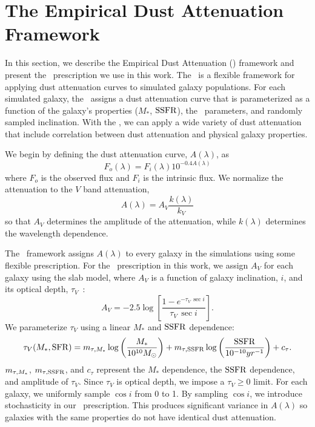 \section{The Empirical Dust Attenuation Framework} \label{sec:dem}
In this section, we describe the Empirical Dust Attenuation (\eda)
framework and present the \eda~prescription we use in this work. 
The \eda~is a flexible framework for applying dust attenuation curves to
simulated galaxy populations.
For each simulated galaxy, the \eda~assigns a dust attenuation
curve that is parameterized as a function of the galaxy's properties 
($M_*$, ${\rm SSFR}$), the \eda~parameters, and randomly
sampled inclination. With the \eda, we can apply a wide variety of dust
attenuation that include correlation between dust attenuation and physical
galaxy properties. 

We begin by defining the dust attenuation curve, $A(\lambda)$, as 
\begin{equation} \label{eq:full_atten}
    F_o (\lambda) = F_i (\lambda) 10^{-0.4 A(\lambda)}
\end{equation}
where $F_o$ is the observed flux and $F_i$ is the intrinsic flux. We normalize
the attenuation to the $V$ band attenuation, 
\begin{equation} 
    A(\lambda) = A_V \frac{k(\lambda)}{k_V}
\end{equation}
so that $A_V$ determines the amplitude of the attenuation, while $k(\lambda)$
determines the wavelength dependence. 

The \eda~framework assigns $A(\lambda)$ to every galaxy in the simulations
using some flexible prescription. For the \eda~prescription in this work,
we assign $A_V$ for each galaxy using the slab model, where $A_V$ is a
function of galaxy inclination, $i$, and its optical depth,
$\tau_V$~\citep[\eg][]{somerville1999, somerville2012}: 
\begin{equation} \label{eq:slab}
    A_V = -2.5 \log \left[ \frac{1 - e^{-\tau_V\,\sec i}}{\tau_V\,\sec i} \right].
\end{equation}
We parameterize $\tau_V$ using a linear $M_*$ and ${\rm SSFR}$ dependence: 
\begin{equation} \label{eq:tauv}
    \tau_V(M_*, \sfr) = \mtaum \log \left(\frac{M_*}{10^{10} M_\odot}\right) +
    \mtaus \log \left(\frac{\ssfr}{10^{-10}yr^{-1}}\right) + c_\tau.
\end{equation}
$m_{\tau,M_*}$, $m_{\tau,{\rm SSFR}}$, and $c_\tau$ represent the $M_*$ dependence, the ${\rm SSFR}$
dependence, and amplitude of $\tau_V$. Since $\tau_V$ is optical depth, we
impose a $\tau_V \ge 0$ limit.
For each galaxy, we uniformly sample $\cos i$ from 0 to 1. 
By sampling $\cos i$, we introduce stochasticity in our \eda~prescription. 
This produces significant variance in $A(\lambda)$ so galaxies with the same
properties do not have identical dust attenuation.

